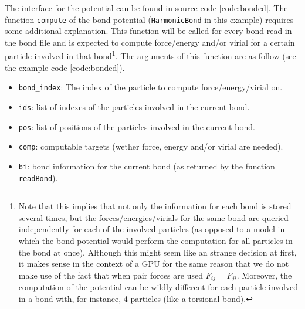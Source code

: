 \documentclass[ twoside,openright,titlepage,numbers=noenddot,%
headinclude,footinclude,cleardoublepage=empty,abstract=on,
BCOR=5mm,paper=a4,fontsize=11pt, dvipsnames
]{scrreprt}
\def\ucpp{uammd_cpp_lexer.py:UAMMDCppLexer -x}
\begin{document}
The interface for the potential can be found in source code \ref{code:bonded}. The function \texttt{compute} of the bond potential (\texttt{HarmonicBond} in this example) requires some additional explanation. This function will be called for every bond read in the bond file and is expected to compute force/energy and/or virial for a certain particle involved in that bond\footnote{Note that this implies that not only the information for each bond is stored several times, but the forces/energies/virials for the same bond are queried independently for each of the involved particles (as opposed to a model in which the bond potential would perform the computation for all particles in the bond at once). Although this might seem like an strange decision at first, it makes sense in the context of a GPU for the same reason that we do not make use of the fact that when pair forces are used $F_{ij} = F_{ji}$. Moreover, the computation of the potential can be wildly different for each particle involved in a bond with, for instance, 4 particles (like a torsional bond).}. The arguments of this function are as follow (see the example code \ref{code:bonded}).
\begin{itemize}
\item \texttt{bond_index}: The index of the particle to compute force/energy/virial on.
\item \texttt{ids}: list of indexes of the particles involved in the current bond.
\item \texttt{pos}: list of positions of the particles involved in the current bond.
\item \texttt{comp}: computable targets (wether force, energy and/or virial are needed).
\item \texttt{bi}: bond information for the current bond (as returned by the function \texttt{readBond}).
\end{itemize}
\end{document}
